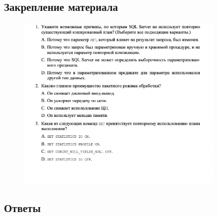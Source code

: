 \subsection*{Закрепление материала}

\begin{figure}[h!]
	\begin{center}
		\includegraphics[width=0.9\textwidth]{img/zakrep49.png}
	\end{center}
	\captionsetup{justification=centering}
\end{figure}
\clearpage	

\subsection*{Ответы}


